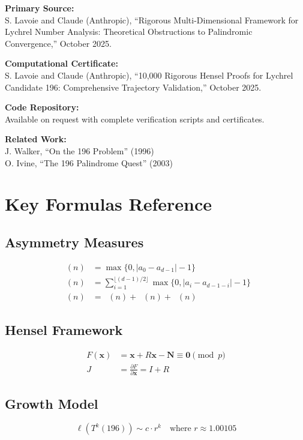 \documentclass[11pt,a4paper]{article}
\theoremstyle{plain}
\theoremstyle{definition}
\DeclareMathOperator{\Aext}{A^{\text{(ext)}}}
\DeclareMathOperator{\Aint}{A^{\text{(int)}}}
\DeclareMathOperator{\Acarry}{A^{\text{(carry)}}}
\DeclareMathOperator{\Arobust}{A^{\text{(robust)}}}
\begin{document}
\raggedright
\textbf{Primary Source:} \\
S. Lavoie and Claude (Anthropic), ``Rigorous Multi-Dimensional Framework for Lychrel Number Analysis: Theoretical Obstructions to Palindromic Convergence,'' October 2025.

\textbf{Computational Certificate:} \\
S. Lavoie and Claude (Anthropic), ``10,000 Rigorous Hensel Proofs for Lychrel Candidate 196: Comprehensive Trajectory Validation,'' October 2025.

\textbf{Code Repository:} \\
Available on request with complete verification scripts and certificates.

\textbf{Related Work:} \\
J. Walker, ``On the 196 Problem'' (1996) \\
O. Ivine, ``The 196 Palindrome Quest'' (2003)

\appendix

\section{Key Formulas Reference}

\subsection{Asymmetry Measures}
\begin{align}
\Aext(n) &= \max\{0, |a_0 - a_{d-1}| - 1\} \\
\Aint(n) &= \sum_{i=1}^{\lfloor (d-1)/2 \rfloor} \max\{0, |a_i - a_{d-1-i}| - 1\} \\
\Arobust(n) &= \Aext(n) + \Aint(n) + \Acarry(n)
\end{align}

\subsection{Hensel Framework}
\begin{align}
F(\mathbf{x}) &= \mathbf{x} + R\mathbf{x} - \mathbf{N} \equiv \mathbf{0} \pmod{p} \\
J &= \frac{\partial F}{\partial \mathbf{x}} = I + R
\end{align}

\subsection{Growth Model}
\begin{equation}
\ell(T^k(196)) \sim c \cdot r^k \quad \text{where } r \approx 1.00105
\end{equation}
\end{document}
